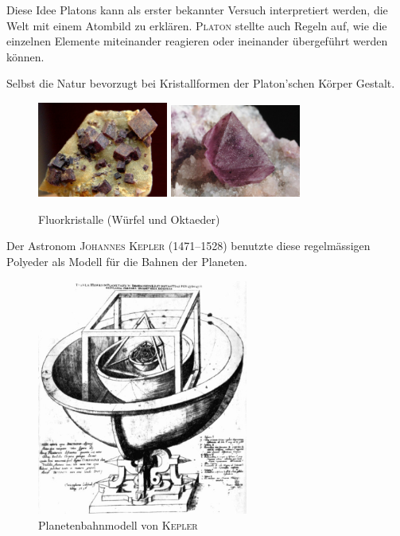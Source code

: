 \documentclass[%
11pt,%
twoside,%
titlepage,%
swissgerman,%
headsepline%
]{scrartcl}
\theoremstyle{definition}
\theoremstyle{plain}
\begin{document}
Diese Idee Platons kann als erster bekannter Versuch interpretiert werden, die Welt mit einem Atombild zu erkl\"aren. \textsc{Platon} stellte auch Regeln auf, wie die einzelnen Elemente miteinander reagieren oder ineinander \"ubergef\"uhrt werden k\"onnen.

Selbst die Natur bevorzugt bei Kristallformen der Platon'schen Körper Gestalt.
\begin{figure}
\begin{center}
\includegraphics[width=0.382\textwidth]{pictures/kristallh}
\includegraphics[width=0.382\textwidth]{pictures/kristallo}
\end{center}
\caption{Fluorkristalle (W\"urfel und Oktaeder)}
\end{figure}
Der Astronom \textsc{Johannes Kepler} (1471--1528) benutzte diese regelm\"assigen Polyeder als Modell f\"ur die Bahnen der Planeten.
\begin{figure}
\begin{center}
\includegraphics[width=0.618\textwidth]{pictures/kepler}
\end{center}
\caption{Planetenbahnmodell von \textsc{Kepler}}
\end{figure}
\end{document}

